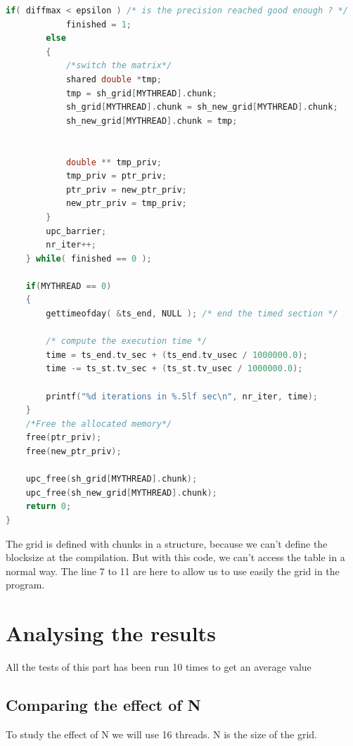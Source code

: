 \documentclass{report}
\begin{document}
\begin{lstlisting}[language=c]
        if( diffmax < epsilon ) /* is the precision reached good enough ? */
            finished = 1;
        else
        {
            /*switch the matrix*/
            shared double *tmp;
            tmp = sh_grid[MYTHREAD].chunk;
            sh_grid[MYTHREAD].chunk = sh_new_grid[MYTHREAD].chunk;
            sh_new_grid[MYTHREAD].chunk = tmp;


            double ** tmp_priv;
            tmp_priv = ptr_priv;
            ptr_priv = new_ptr_priv;
            new_ptr_priv = tmp_priv;
        }
        upc_barrier;
        nr_iter++;
    } while( finished == 0 );

    if(MYTHREAD == 0)
    {
        gettimeofday( &ts_end, NULL ); /* end the timed section */

        /* compute the execution time */
        time = ts_end.tv_sec + (ts_end.tv_usec / 1000000.0);
        time -= ts_st.tv_sec + (ts_st.tv_usec / 1000000.0);

        printf("%d iterations in %.5lf sec\n", nr_iter, time);
    }
    /*Free the allocated memory*/
    free(ptr_priv);
    free(new_ptr_priv);

    upc_free(sh_grid[MYTHREAD].chunk);
    upc_free(sh_new_grid[MYTHREAD].chunk);
    return 0;
}
\end{lstlisting}

The grid is defined with chunks in a structure, because we can't define the blocksize at the compilation. But with this code, we can't access the table in a normal way. The line 7 to 11 are here to allow us to use easily the grid in the program.

\section{Analysing the results}

All the tests of this part has been run 10 times to get an average value

\subsection{Comparing the effect of N}

To study the effect of N we will use 16 threads. N is the size of the grid.
\end{document}
